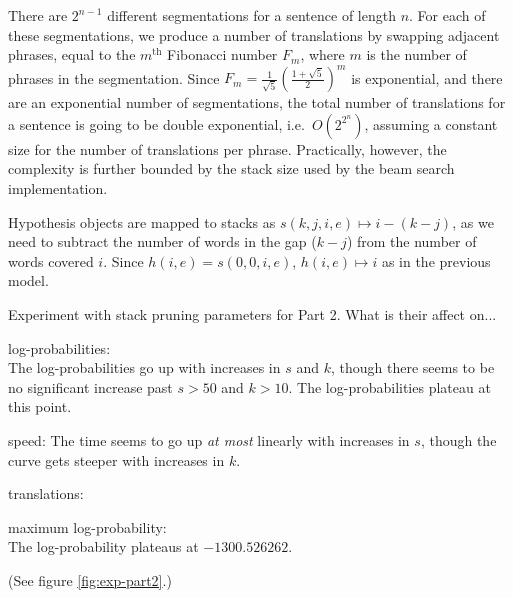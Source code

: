 \documentclass[answers]{exam}
\begin{document}
\begin{questions}
\begin{framed}
  There are $2^{n-1}$ different segmentations for a sentence of length $n$.
  For each of these segmentations, we produce a number of translations by
  swapping adjacent phrases, equal to the $m^{\text{th}}$ Fibonacci number
  $F_m$, where $m$ is the number of phrases in the segmentation.
  Since $F_m = \frac{1}{\sqrt{5}}(\frac{1+\sqrt{5}}{2})^m$ is exponential, and
  there are an exponential number of segmentations, the total number of
  translations for a sentence is going to be double exponential, i.e.\
  $O(2^{2^n})$, assuming a constant size for the number of translations per
  phrase.
  Practically, however, the complexity is further bounded by the stack size used
  by the beam search implementation.
\end{framed}


\begin{framed}
  Hypothesis objects are mapped to stacks as $s(k,j,i,e)\mapsto i - (k - j)$, as
  we need to subtract the number of words in the gap ($k - j$) from the number
  of words covered $i$. Since $h(i,e) = s(0,0,i,e)$, $h(i,e)\mapsto i$ as in
  the previous model.
\end{framed}


\addtocounter{question}{1}
\question[15] Experiment with stack pruning parameters for Part 2. What is their affect on...
\begin{framed}
\begin{compactenum}[a.]
\item log-probabilities:\\
  The log-probabilities go up with increases in $s$ and $k$, though there seems
  to be no significant increase past $s > 50$ and $k > 10$. The
  log-probabilities plateau at this point. 
\item speed:
  The time seems to go up \emph{at most} linearly with increases in $s$, though
  the curve gets steeper with increases in $k$.
\item translations:
\item maximum log-probability:\\
  The log-probability plateaus at $-1300.526262$.
\end{compactenum}
(See figure \ref{fig:exp-part2}.)
\end{framed}



\end{questions}
\end{document}

